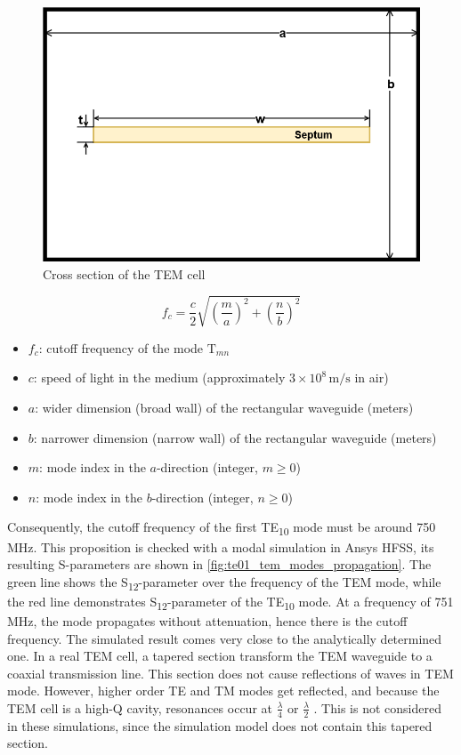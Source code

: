 \begin{figure}[h]
    \centering
    \includegraphics[width=0.5\linewidth]{Documentation//content//10_theory//img/tem_cell_crosssection.png}
    \caption{Cross section of the TEM cell}
    \label{fig:tem_cell_crosssection}
\end{figure}

\begin{equation}
    f_c = \frac{c}{2} \sqrt{\left(\frac{m}{a}\right)^2 + \left(\frac{n}{b}\right)^2}
    \label{eqn:cutoff_frequency_rect_waveguide}
\end{equation}

\begin{itemize}
  \item \( f_c \): cutoff frequency of the mode \(\text{T}_{mn}\)
  \item \( c \): speed of light in the medium (approximately \(3 \times 10^8 \, \text{m/s}\) in air)
  \item \( a \): wider dimension (broad wall) of the rectangular waveguide (meters)
  \item \( b \): narrower dimension (narrow wall) of the rectangular waveguide (meters)
  \item \( m \): mode index in the \(a\)-direction (integer, \(m \geq 0\))
  \item \( n \): mode index in the \(b\)-direction (integer, \(n \geq 0\))
\end{itemize}

Consequently, the cutoff frequency of the first TE\textsubscript{10} mode must be around 750\,MHz. This proposition is checked with a modal simulation in Ansys HFSS, its resulting S-parameters are shown in \autoref{fig:te01_tem_modes_propagation}. The green line shows the S\textsubscript{12}-parameter over the frequency of the TEM mode, while the red line demonstrates S\textsubscript{12}-parameter of the TE\textsubscript{10} mode. At a frequency of 751\,MHz, the mode propagates without attenuation, hence there is the cutoff frequency. The simulated result comes very close to the analytically determined one. In a real TEM cell, a tapered section transform the TEM waveguide to a coaxial transmission line. This section does not cause reflections of waves in TEM mode. However, higher order TE and TM modes get reflected, and because the TEM cell is a high-Q cavity, resonances occur at $\frac{\lambda}{4}$ or $\frac{\lambda}{2}$ \cite{990711}. This is not considered in these simulations, since the simulation model does not contain this tapered section.

